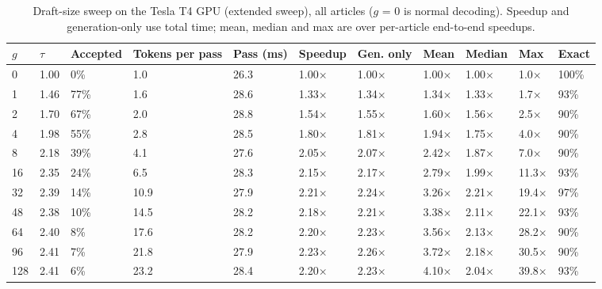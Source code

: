 \documentclass[11pt,a4paper]{article}
\begin{document}
\begin{table}[H]
\centering
\small
\caption{Draft-size sweep on the Tesla T4 GPU (extended sweep), all articles ($g$ = 0 is normal decoding). Speedup and generation-only use total time; mean, median and max are over per-article end-to-end speedups.}
\setlength{\tabcolsep}{4pt}
\begin{tabular}{L{0.81cm}L{0.90cm}L{1.54cm}L{1.36cm}L{1.17cm}L{1.45cm}L{1.26cm}L{1.08cm}L{1.26cm}L{1.08cm}L{1.08cm}}
\toprule
\textbf{$g$} & \textbf{$\tau$} & \textbf{Accepted} & \textbf{Tokens per pass} & \textbf{Pass (ms)} & \textbf{Speedup} & \textbf{Gen. only} & \textbf{Mean} & \textbf{Median} & \textbf{Max} & \textbf{Exact} \\
 & 1.00 & 0\% & 1.0 & 26.3 & 1.00$\times$ & 1.00$\times$ & 1.00$\times$ & 1.00$\times$ & 1.0$\times$ & 100\% \\
1 & 1.46 & 77\% & 1.6 & 28.6 & 1.33$\times$ & 1.34$\times$ & 1.34$\times$ & 1.33$\times$ & 1.7$\times$ & 93\% \\
2 & 1.70 & 67\% & 2.0 & 28.8 & 1.54$\times$ & 1.55$\times$ & 1.60$\times$ & 1.56$\times$ & 2.5$\times$ & 90\% \\
4 & 1.98 & 55\% & 2.8 & 28.5 & 1.80$\times$ & 1.81$\times$ & 1.94$\times$ & 1.75$\times$ & 4.0$\times$ & 90\% \\
8 & 2.18 & 39\% & 4.1 & 27.6 & 2.05$\times$ & 2.07$\times$ & 2.42$\times$ & 1.87$\times$ & 7.0$\times$ & 90\% \\
16 & 2.35 & 24\% & 6.5 & 28.3 & 2.15$\times$ & 2.17$\times$ & 2.79$\times$ & 1.99$\times$ & 11.3$\times$ & 93\% \\
32 & 2.39 & 14\% & 10.9 & 27.9 & 2.21$\times$ & 2.24$\times$ & 3.26$\times$ & 2.21$\times$ & 19.4$\times$ & 97\% \\
48 & 2.38 & 10\% & 14.5 & 28.2 & 2.18$\times$ & 2.21$\times$ & 3.38$\times$ & 2.11$\times$ & 22.1$\times$ & 93\% \\
64 & 2.40 & 8\% & 17.6 & 28.2 & 2.20$\times$ & 2.23$\times$ & 3.56$\times$ & 2.13$\times$ & 28.2$\times$ & 90\% \\
96 & 2.41 & 7\% & 21.8 & 27.9 & 2.23$\times$ & 2.26$\times$ & 3.72$\times$ & 2.18$\times$ & 30.5$\times$ & 90\% \\
128 & 2.41 & 6\% & 23.2 & 28.4 & 2.20$\times$ & 2.23$\times$ & 4.10$\times$ & 2.04$\times$ & 39.8$\times$ & 93\% \\
\bottomrule
\end{tabular}
\end{table}
\end{document}
